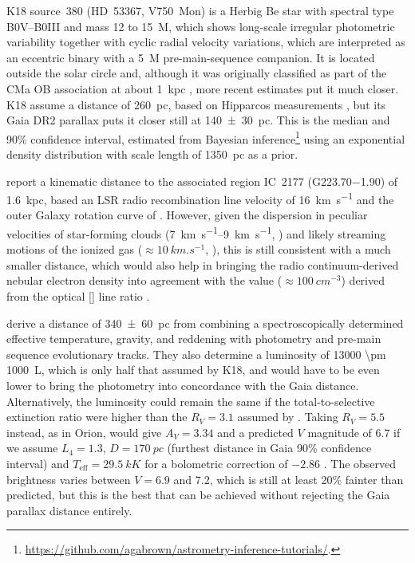 \documentclass[useAMS, usenatbib, a4paper]{mnras}
\begin{document}
K18 source~380 (HD~53367, V750~Mon) is a Herbig Be star with spectral
type B0V--B0III and mass 12 to \SI{15}{M_\odot}, which shows
long-scale irregular photometric variability \citep{Tjin-A-Djie:2001a,
  Pogodin:2006a} together with cyclic radial velocity variations,
which are interpreted as an eccentric binary with a \SI{5}{M_\odot}
pre-main-sequence companion.  It is located outside the solar circle
and, although it was originally classified as part of the CMa OB
association at about \SI{1}{kpc} \citep{Tjin-A-Djie:2001a}, more
recent estimates put it much closer.  K18 assume a distance of
\SI{260}{pc}, based on Hipparcos measurements
\citep{van-Leeuwen:2007a}, but its Gaia DR2 parallax
\citep{Gaia-Collaboration:2016a, Gaia-Collaboration:2018a, Luri:2018a}
puts it closer still at \SI{140 \pm 30}{pc}.  This is the median and
90\% confidence interval, estimated from Bayesian
inference\footnote{\url{https://github.com/agabrown/astrometry-inference-tutorials/}.}
using an exponential density distribution with scale length of
\SI{1350}{pc} as a prior.

\citet{Quireza:2006b} report a kinematic distance to the associated
\hii{} region IC~2177 (G\num{223.70}\num{-1.90}) of \SI{1.6}{kpc},
based an LSR radio recombination line velocity of \SI{+16}{km.s^{-1}}
\citep{Quireza:2006a} and the outer Galaxy rotation curve of
\citet{Brand:1993a}.  However, given the dispersion in peculiar
velocities of star-forming clouds (\SIrange{7}{9}{km.s^{-1}},
\citealp{Stark:1984a}) and likely streaming motions of the ionized gas
(\(\approx \SI{10}{km.s^{-1}}\), \citealp{Matzner:2002a, Lee:2012a}),
this is still consistent with a much smaller distance, which would
also help in bringing the radio continuum-derived nebular electron
density into agreement with the value (\(\approx \SI{100}{cm^{-3}}\))
derived from the optical [] line ratio
\citep{Hawley:1978a}.

\citet{Fairlamb:2015a} derive a distance of \SI{340 \pm 60}{pc} from
combining a spectroscopically determined effective temperature,
gravity, and reddening with photometry and pre-main sequence
evolutionary tracks.  They also determine a luminosity of \SI{13000
  \pm 1000}{L_\odot}, which is only half that assumed by K18, and
would have to be even lower to bring the photometry into concordance
with the Gaia distance.  Alternatively, the luminosity could remain
the same if the total-to-selective extinction ratio were higher than
the \(R_V = 3.1\) assumed by \citet{Fairlamb:2015a}.  Taking
\(R_V = 5.5\) instead, as in Orion, would give \(A_V = 3.34\) and a
predicted \(V\) magnitude of 6.7 if we assume \(L_4 = 1.3\),
\(D = \SI{170}{pc}\) (furthest distance in Gaia 90\% confidence
interval) and \(T_{\text{eff}} = \SI{29.5}{kK}\)
\citep{Fairlamb:2015a} for a bolometric correction of \(-2.86\)
\citep{Nieva:2013a}.  The observed brightness varies between
\(V = 6.9\) and 7.2, which is still at least 20\% fainter than
predicted, but this is the best that can be achieved without rejecting
the Gaia parallax distance entirely.
\end{document}
